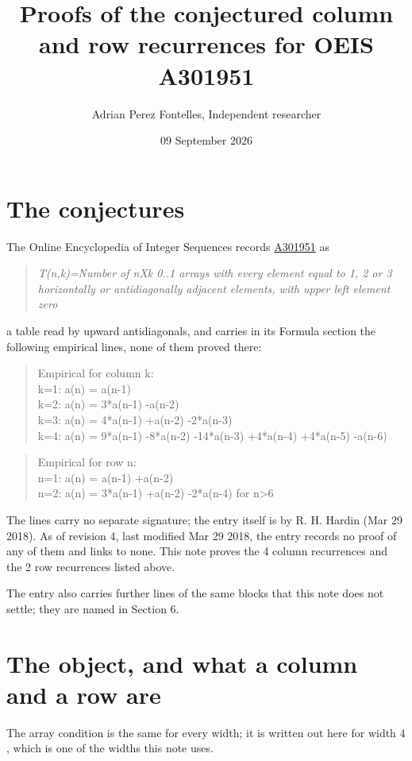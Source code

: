 \documentclass[11pt]{article}
\title{Proofs of the conjectured column and row recurrences for OEIS A301951}
\author{Adrian Perez Fontelles, Independent researcher}
\date{09 September 2026}
\theoremstyle{definition}
\begin{document}
\maketitle
\section{The conjectures}

The Online Encyclopedia of Integer Sequences records \href{https://oeis.org/A301951}{A301951} as

\begin{quote}\itshape T(n,k)=Number of nXk 0..1 arrays with every element equal to 1, 2 or 3 horizontally or antidiagonally adjacent elements, with upper left element zero\end{quote}

a table read by upward antidiagonals, and carries in its Formula section the following empirical lines, none of them proved there:

\begin{quote}\ttfamily Empirical for column k:\\
k=1: a(n) = a(n-1)\\k=2: a(n) = 3*a(n-1) -a(n-2)\\k=3: a(n) = 4*a(n-1) +a(n-2) -2*a(n-3)\\k=4: a(n) = 9*a(n-1) -8*a(n-2) -14*a(n-3) +4*a(n-4) +4*a(n-5) -a(n-6)\end{quote}

\begin{quote}\ttfamily Empirical for row n:\\
n=1: a(n) = a(n-1) +a(n-2)\\n=2: a(n) = 3*a(n-1) +a(n-2) -2*a(n-4) for n>6\end{quote}

The lines carry no separate signature; the entry itself is by R. H. Hardin (Mar 29 2018). As of revision 4, last modified Mar 29 2018, the entry records no proof of any of them and links to none. This note proves the 4 column recurrences and the 2 row recurrences listed above.

The entry also carries further lines of the same blocks that this note does not settle; they are named in Section 6.

\section{The object, and what a column and a row are}

The array condition is the same for every width; it is written out here for width $4$, which is one of the widths this note uses.
\end{document}
